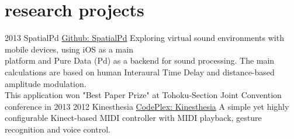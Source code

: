 \documentclass[]{friggeri-cv}
\begin{document}
\section{research projects}
\begin{entrylist}
  \entry
    {2013}
    {SpatialPd}
    {\href{https://github.com/Apolotary/SpatialPd}{Github: SpatialPd}}
    {Exploring virtual sound environments with mobile devices, using iOS as a main\\
    platform and Pure Data (Pd) as a backend for sound processing. The main\\
    calculations are based on human Interaural Time Delay and distance-based amplitude modulation.\\
    This application won "Best Paper Prize" at Tohoku-Section Joint Convention conference in 2013}
  \entry
    {2012}
    {Kinesthesia}
    {\href{https://kinesthesia.codeplex.com/}{CodePlex: Kinesthesia}}
    {A simple yet highly configurable Kinect-based MIDI controller with MIDI playback, gesture recognition and voice control.}
\end{entrylist}
%
%
\end{document}
